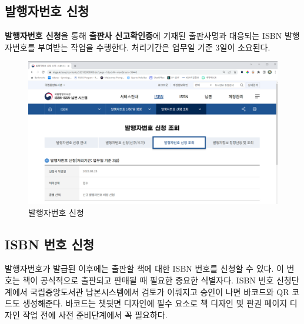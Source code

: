 \documentclass[
  letterpaper,
]{book}
\begin{document}
\hypertarget{uxbc1cuxd589uxc790uxbc88uxd638-uxc2e0uxccad}{%
\subsection{발행자번호
신청}\label{uxbc1cuxd589uxc790uxbc88uxd638-uxc2e0uxccad}}

\textbf{발행자번호 신청}을 통해 \textbf{출판사 신고확인증}에 기재된
출판사명과 대응되는 ISBN 발행자번호를 부여받는 작업을 수행한다.
처리기간은 업무일 기준 3일이 소요된다.

\begin{figure}

{\centering \includegraphics[width=6.36458in,height=\textheight]{images/publisher_isbn.png}

}

\caption{발행자번호 신청}

\end{figure}

\hypertarget{isbn-uxbc88uxd638-uxc2e0uxccad}{%
\subsection{ISBN 번호 신청}\label{isbn-uxbc88uxd638-uxc2e0uxccad}}

발행자번호가 발급된 이후에는 출판할 책에 대한 ISBN 번호를 신청할 수
있다. 이 번호는 책이 공식적으로 출판되고 판매될 때 필요한 중요한
식별자다. ISBN 번호 신청단계에서 국립중앙도서관 납본시스템에서 검토가
이뤄지고 승인이 나면 바코드와 QR 코드도 생성해준다. 바코드는 챗뒷면
디자인에 필수 요소로 책 디자인 및 판권 페이지 디자인 작업 전에 사전
준비단계에서 꼭 필요하다.
\end{document}
